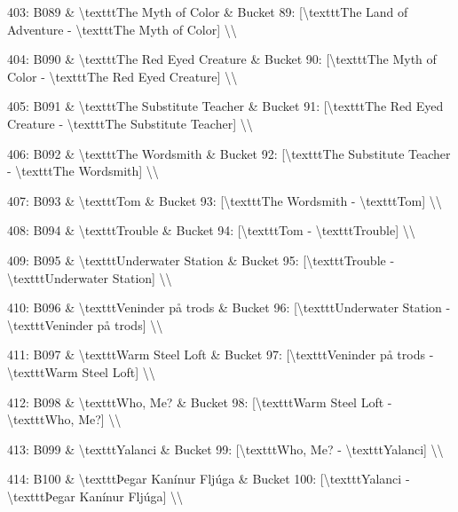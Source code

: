 \documentclass[11pt,a4paper]{article}
\begin{document}
403: B089 \& \textbackslash{}texttt{The Myth of Color} \& Bucket 89: [\textbackslash{}texttt{The Land of Adventure} - \textbackslash{}texttt{The Myth of Color}] \textbackslash{}\textbackslash{}

404: B090 \& \textbackslash{}texttt{The Red Eyed Creature} \& Bucket 90: [\textbackslash{}texttt{The Myth of Color} - \textbackslash{}texttt{The Red Eyed Creature}] \textbackslash{}\textbackslash{}

405: B091 \& \textbackslash{}texttt{The Substitute Teacher} \& Bucket 91: [\textbackslash{}texttt{The Red Eyed Creature} - \textbackslash{}texttt{The Substitute Teacher}] \textbackslash{}\textbackslash{}

406: B092 \& \textbackslash{}texttt{The Wordsmith} \& Bucket 92: [\textbackslash{}texttt{The Substitute Teacher} - \textbackslash{}texttt{The Wordsmith}] \textbackslash{}\textbackslash{}

407: B093 \& \textbackslash{}texttt{Tom} \& Bucket 93: [\textbackslash{}texttt{The Wordsmith} - \textbackslash{}texttt{Tom}] \textbackslash{}\textbackslash{}

408: B094 \& \textbackslash{}texttt{Trouble} \& Bucket 94: [\textbackslash{}texttt{Tom} - \textbackslash{}texttt{Trouble}] \textbackslash{}\textbackslash{}

409: B095 \& \textbackslash{}texttt{Underwater Station} \& Bucket 95: [\textbackslash{}texttt{Trouble} - \textbackslash{}texttt{Underwater Station}] \textbackslash{}\textbackslash{}

410: B096 \& \textbackslash{}texttt{Veninder på trods} \& Bucket 96: [\textbackslash{}texttt{Underwater Station} - \textbackslash{}texttt{Veninder på trods}] \textbackslash{}\textbackslash{}

411: B097 \& \textbackslash{}texttt{Warm Steel Loft} \& Bucket 97: [\textbackslash{}texttt{Veninder på trods} - \textbackslash{}texttt{Warm Steel Loft}] \textbackslash{}\textbackslash{}

412: B098 \& \textbackslash{}texttt{Who, Me?} \& Bucket 98: [\textbackslash{}texttt{Warm Steel Loft} - \textbackslash{}texttt{Who, Me?}] \textbackslash{}\textbackslash{}

413: B099 \& \textbackslash{}texttt{Yalanci} \& Bucket 99: [\textbackslash{}texttt{Who, Me?} - \textbackslash{}texttt{Yalanci}] \textbackslash{}\textbackslash{}

414: B100 \& \textbackslash{}texttt{Þegar Kanínur Fljúga} \& Bucket 100: [\textbackslash{}texttt{Yalanci} - \textbackslash{}texttt{Þegar Kanínur Fljúga}] \textbackslash{}\textbackslash{}
\end{document}
